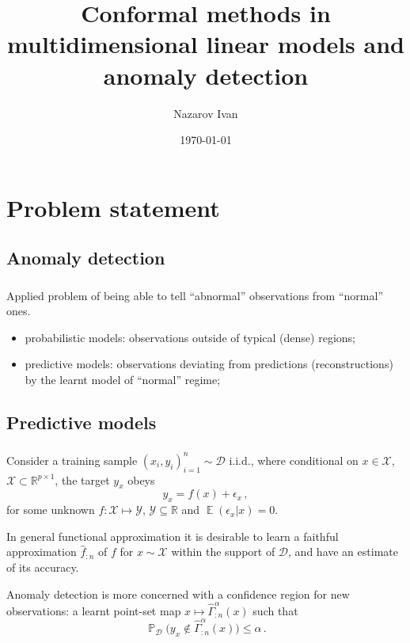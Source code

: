 \documentclass[t]{beamer}  %
\title{Conformal methods in multidimensional linear models and anomaly detection}
\author[Nazarov Ivan]{Nazarov Ivan}
\date{\today}
\institute[Higher School of Economics]{National Research University \\ Higher School of Economics}
\newcommand{\Ycal}{\mathcal{Y}}
\newcommand{\Dcal}{\mathcal{D}}
\newcommand{\Xcal}{\mathcal{X}}
\newcommand{\Real}{\mathbb{R}}
\newcommand{\ex}{\mathop{\mathbb{E}}\nolimits}
\newcommand{\pr}{\mathop{\mathbb{P}}\nolimits}
\begin{document}
\frame[plain]{\titlepage} %

\section{Problem statement} %
\label{sec:problem_statement}
\subsection{Anomaly detection} %
\label{sub:anomaly_detection}


\begin{frame}[c]\frametitle{\insertsection}
  \framesubtitle{\insertsubsection}
  \begin{block}{}
    Applied problem of being able to tell ``abnormal'' observations from ``normal''
    ones. %
    \begin{itemize}
      \item probabilistic models: observations outside of typical (dense) regions;
      \item predictive models: observations deviating from predictions (reconstructions)
      by the learnt model of ``normal'' regime;
    \end{itemize}
  \end{block}
\end{frame}


\subsection{Predictive models} %
\label{sub:predictive_models}

\begin{frame}[c]\frametitle{\insertsection}
  \framesubtitle{\insertsubsection}
  \begin{block}{}
    Consider a training sample $(x_i, y_i)_{i=1}^n \sim \Dcal$ i.i.d., where conditional
    on $x\in \Xcal$, $\Xcal \subset \Real^{p\times 1}$, the target $y_x$ obeys
    $$ y_x = f(x) + \epsilon_x \,, $$
    for some unknown $f:\Xcal\mapsto \Ycal$, $\Ycal\subseteq \Real$ and $\ex(\epsilon_x|x) = 0$.

    In general functional approximation it is desirable to learn a faithful approximation
    $\hat{f}_{:n}$ of $f$ for $x\sim \Xcal$ within the support of $\Dcal$, and have an
    estimate of its accuracy.

    Anomaly detection is more concerned with a confidence region for new observations:
    a learnt point-set map $x \mapsto \hat{\Gamma}_{:n}^\alpha(x)$ such that
    $$ \pr_\Dcal\bigl(y_x \notin \hat{\Gamma}_{:n}^\alpha(x)\bigr) \leq \alpha \,. $$
  \end{block}
\end{frame}
\end{document}

